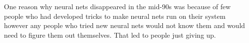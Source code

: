 {\centering{}\par}
\vspace{5pt}

One reason why neural nets disappeared in the mid-90s was because of few people who had developed tricks to make neural nets run on their system however any people who tried new neural nets would not know them and would need to figure them out themselves. 
That led to people just giving up. 